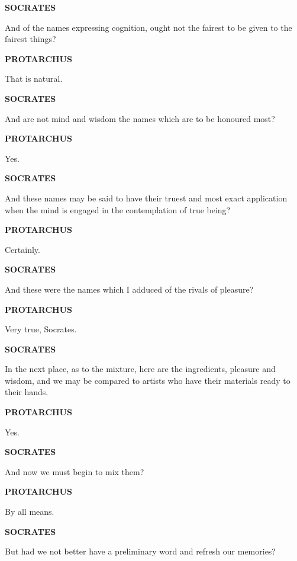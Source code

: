 \documentclass[11pt,letter]{article}
\begin{document}
\par \textbf{SOCRATES}
\par   And of the names expressing cognition, ought not the fairest to be given to the fairest things?

\par \textbf{PROTARCHUS}
\par   That is natural.

\par \textbf{SOCRATES}
\par   And are not mind and wisdom the names which are to be honoured most?

\par \textbf{PROTARCHUS}
\par   Yes.

\par \textbf{SOCRATES}
\par   And these names may be said to have their truest and most exact application when the mind is engaged in the contemplation of true being?

\par \textbf{PROTARCHUS}
\par   Certainly.

\par \textbf{SOCRATES}
\par   And these were the names which I adduced of the rivals of pleasure?

\par \textbf{PROTARCHUS}
\par   Very true, Socrates.

\par \textbf{SOCRATES}
\par   In the next place, as to the mixture, here are the ingredients, pleasure and wisdom, and we may be compared to artists who have their materials ready to their hands.

\par \textbf{PROTARCHUS}
\par   Yes.

\par \textbf{SOCRATES}
\par   And now we must begin to mix them?

\par \textbf{PROTARCHUS}
\par   By all means.

\par \textbf{SOCRATES}
\par   But had we not better have a preliminary word and refresh our memories?
\end{document}
